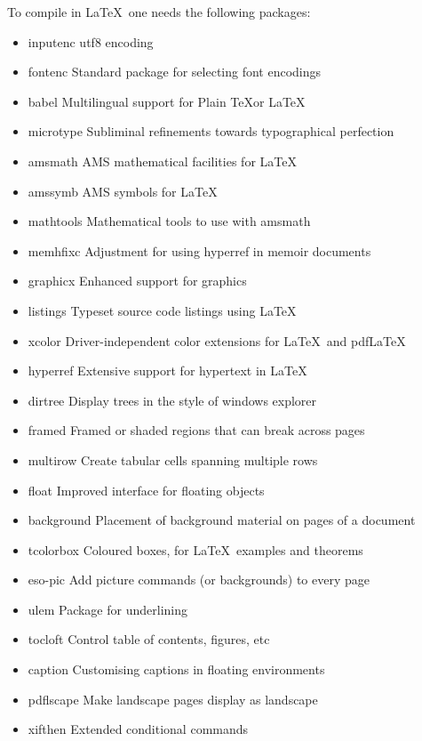 To compile in \LaTeX\, one needs the following packages:
\begin{itemize}
	\item inputenc \dotfill utf8 encoding
	\item fontenc \dotfill Standard package for selecting font encodings
	\item babel \dotfill Multilingual support for Plain \TeX or \LaTeX
	\item microtype \dotfill Sublim­i­nal re­fine­ments to­wards ty­po­graph­i­cal per­fec­tion
	\item amsmath \dotfill AMS mathematical facilities for \LaTeX
	\item amssymb \dotfill AMS symbols for \LaTeX
	\item mathtools \dotfill Mathematical tools to use with amsmath
	\item memhfixc \dotfill Adjustment for using hyperref in memoir documents
	\item graphicx \dotfill Enhanced support for graphics
	\item listings \dotfill Typeset source code listings using \LaTeX
	\item xcolor \dotfill Driver-independent color extensions for \LaTeX\, and pdf\LaTeX
	\item hyperref \dotfill Extensive support for hypertext in \LaTeX
	\item dirtree \dotfill Display trees in the style of windows explorer
	\item framed \dotfill Framed or shaded regions that can break across pages
	\item multirow \dotfill Create tabular cells spanning multiple rows
	\item float \dotfill Improved interface for floating objects
	\item background \dotfill Placement of background material on pages of a document
	\item tcolorbox \dotfill Coloured boxes, for \LaTeX\, examples and theorems
	\item eso-pic \dotfill Add picture commands (or backgrounds) to every page
	\item ulem \dotfill Package for underlining
	\item tocloft \dotfill Con­trol ta­ble of con­tents, fig­ures, etc
	\item caption \dotfill Cus­tomis­ing cap­tions in float­ing en­vi­ron­ments
	\item pdflscape \dotfill Make land­scape pages dis­play as land­scape
	\item xifthen \dotfill Ex­tended con­di­tional com­mands
\end{itemize}


